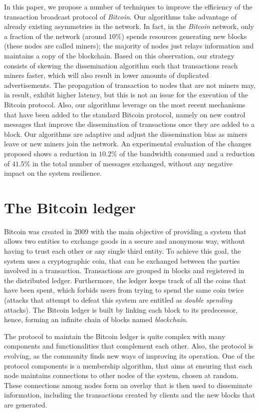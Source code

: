 \documentclass{dads}   %
\begin{document}
In this paper, we propose a number of techniques to improve the efficiency of the transaction broadcast protocol of \textit{Bitcoin}. Our algorithms take advantage of already existing asymmetries in the network. In fact, in the \textit{Bitcoin} network, only a fraction of the network (around $10\%$) spends resources generating new blocks (these nodes are called miners);  the majority of nodes just relays information and maintains a copy of the blockchain. Based on this observation, our strategy consists of skewing the dissemination algorithm such that transactions reach miners faster, which will also result in lower amounts of duplicated advertisements. The propagation of transaction to nodes that are not miners may, in result, exhibit higher latency, but this is not an issue for the execution of the Bitcoin protocol. Also, our algorithms leverage on the most recent mechanisms that have been added to the standard Bitcoin protocol, namely on new control messages that improve the dissemination of transactions once they are added to a block. Our algorithms are adaptive and adjust the dissemination bias as miners leave or new miners join the network. An experimental evaluation of the changes proposed shows a reduction in $10.2\%$ of the bandwidth consumed and a reduction of $41.5\%$ in the total number of messages exchanged, without any negative impact on the system resilience.

\section{The {\secit Bitcoin} ledger}

Bitcoin was created in 2009 with the main objective of providing a system that allows two entities to exchange goods in a secure and anonymous way, without having to trust each other or any single third entity. To achieve this goal, the system uses a cryptographic coin, that can be exchanged between the parties involved in a transaction. Transactions are grouped in blocks and registered in the distributed ledger. Furthermore, the ledger keeps track of all the coins that have been spent, which forbids users from trying to spend the same coin twice (attacks that attempt to defeat this system are entitled as \textit{double spending} attacks). The Bitcoin ledger is built by linking each block to its predecessor, hence, forming an infinite chain of blocks named \textit{blockchain}.

The protocol to maintain the Bitcoin ledger is quite complex with many components and functionalities that complement each other. Also, the protocol is evolving, as the community finds new ways of improving its operation. One of the protocol components is a membership algorithm,  that aims at ensuring that each node maintains connections to other nodes of the system, chosen at random. These connections among nodes form an overlay that is then used to disseminate information, including the transactions created by clients and the new blocks that are generated.
\end{document}

